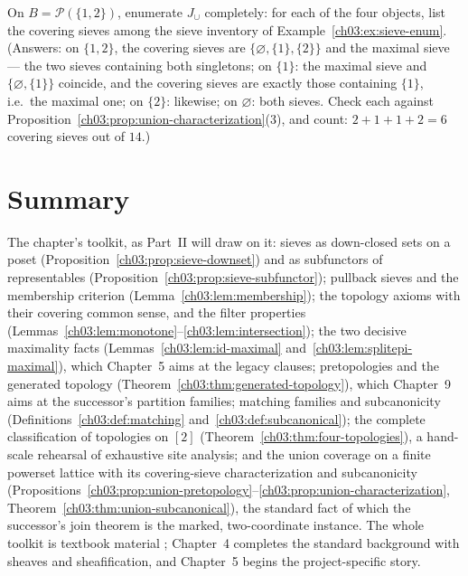 \begin{exercise}\label{ch03:exr:union-square}
On $B = \mathcal{P}(\{1,2\})$, enumerate $J_{\cup}$ completely:
for each of the four objects, list the covering sieves among the
sieve inventory of Example~\ref{ch03:ex:sieve-enum}. (Answers:
on $\{1,2\}$, the covering sieves are
$\{\varnothing, \{1\}, \{2\}\}$ and the maximal sieve --- the
two sieves containing both singletons; on $\{1\}$: the maximal
sieve and $\{\varnothing, \{1\}\}$ coincide, and the covering
sieves are exactly those containing $\{1\}$, i.e.\ the maximal
one; on $\{2\}$: likewise; on $\varnothing$: both sieves. Check
each against
Proposition~\ref{ch03:prop:union-characterization}(3), and count:
$2 + 1 + 1 + 2 = 6$ covering sieves out of $14$.)
\end{exercise}

\section{Summary}\label{ch03:sec:summary}

The chapter's toolkit, as Part~II will draw on it: sieves as
down-closed sets on a poset
(Proposition~\ref{ch03:prop:sieve-downset}) and as subfunctors of
representables (Proposition~\ref{ch03:prop:sieve-subfunctor});
pullback sieves and the membership criterion
(Lemma~\ref{ch03:lem:membership}); the topology axioms with their
covering common sense, and the filter properties
(Lemmas~\ref{ch03:lem:monotone}--\ref{ch03:lem:intersection});
the two decisive maximality facts
(Lemmas~\ref{ch03:lem:id-maximal}
and~\ref{ch03:lem:splitepi-maximal}), which Chapter~5 aims at the
legacy clauses; pretopologies and the generated topology
(Theorem~\ref{ch03:thm:generated-topology}), which Chapter~9 aims
at the successor's partition families; matching families and
subcanonicity (Definitions~\ref{ch03:def:matching}
and~\ref{ch03:def:subcanonical}); the complete classification of
topologies on $[2]$
(Theorem~\ref{ch03:thm:four-topologies}), a hand-scale rehearsal
of exhaustive site analysis; and the union coverage on a finite
powerset lattice with its covering-sieve characterization and
subcanonicity
(Propositions~\ref{ch03:prop:union-pretopology}--\ref{ch03:prop:union-characterization},
Theorem~\ref{ch03:thm:union-subcanonical}), the standard fact of
which the successor's join theorem is the marked, two-coordinate
instance. The whole toolkit is textbook material
\cite{maclane,stacks00ZC,stacks00W1,stacks00WO,johnstone};
Chapter~4 completes the standard background with sheaves and
sheafification, and Chapter~5 begins the project-specific story.
